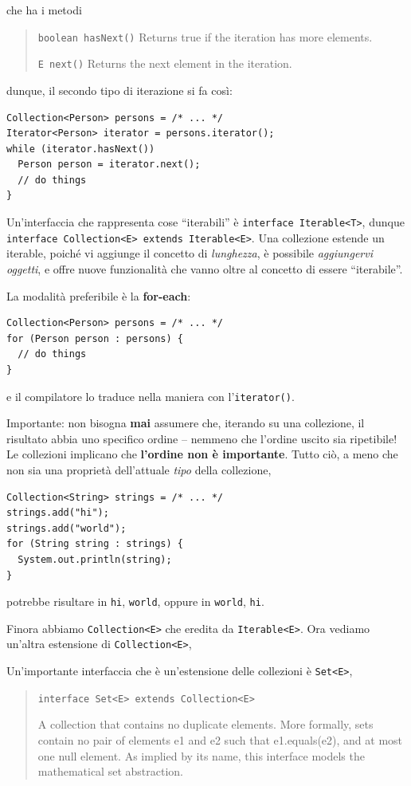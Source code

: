 \documentclass[\fontsizeclass,twocolumn]{\classname}
\theoremstyle{definition}
\theoremstyle{definition}
\begin{document}
che ha i metodi
\begin{quote}
    \footnotesize{\texttt{boolean	hasNext()}	Returns true if the iteration has more elements.

        \texttt{E	next()}	Returns the next element in the iteration.
}
\end{quote}

dunque, il secondo tipo di iterazione si fa così:

\begin{lstlisting}
Collection<Person> persons = /* ... */
Iterator<Person> iterator = persons.iterator();
while (iterator.hasNext())
  Person person = iterator.next();
  // do things
}
\end{lstlisting}

Un'interfaccia che rappresenta cose ``iterabili'' è \texttt{interface
Iterable<T>}, dunque \texttt{interface Collection<E> extends Iterable<E>}.
Una collezione estende un iterable, poiché vi aggiunge il concetto di
\emph{lunghezza}, è possibile \emph{aggiungervi oggetti}, e offre nuove
funzionalità che vanno oltre al concetto di essere ``iterabile''.

La modalità preferibile è la \textbf{for\--each}:

\begin{lstlisting}
Collection<Person> persons = /* ... */
for (Person person : persons) {
  // do things
}
\end{lstlisting}

e il compilatore lo traduce nella maniera con l'\texttt{iterator()}.

Importante: non bisogna \textbf{mai} assumere che, iterando su una collezione,
il risultato abbia uno specifico ordine -- nemmeno che l'ordine uscito sia
ripetibile! Le collezioni implicano che \textbf{l'ordine non è importante}.
Tutto ciò, a meno che non sia una proprietà dell'attuale \emph{tipo} della
collezione,

\begin{lstlisting}
Collection<String> strings = /* ... */
strings.add("hi");
strings.add("world");
for (String string : strings) {
  System.out.println(string);
}
\end{lstlisting}

potrebbe risultare in \texttt{hi}, \texttt{world}, oppure in \texttt{world},
\texttt{hi}.

Finora abbiamo \texttt{Collection<E>} che eredita da \texttt{Iterable<E>}. Ora
vediamo un'altra estensione di \texttt{Collection<E>},

Un'importante interfaccia che è un'estensione delle collezioni è
\texttt{Set<E>},
\begin{quote}
    \footnotesize{\texttt{interface Set<E> extends Collection<E>}

A collection that contains no duplicate elements. More formally, sets contain
no pair of elements e1 and e2 such that e1.equals(e2), and at most one null
element. As implied by its name, this interface models the mathematical set
abstraction.
}
\end{quote}
\end{document}
